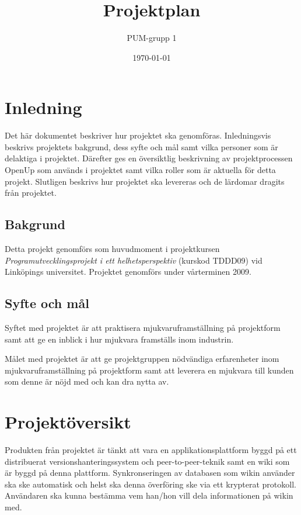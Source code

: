 

\ifpdf
\else
\fi

\title{Projektplan}
\author{PUM-grupp 1}
\date{\today}



\maketitle\thispagestyle{empty}

\newpage

\section{Inledning}
Det här dokumentet beskriver hur projektet ska genomföras. Inledningsvis beskrivs projektets bakgrund, dess syfte och mål samt vilka personer som är delaktiga i projektet. Därefter ges en översiktlig beskrivning av projektprocessen OpenUp som används i projektet samt vilka roller som är aktuella för detta projekt. Slutligen beskrivs hur projektet ska levereras och de lärdomar dragits från projektet.

\subsection{Bakgrund}
Detta projekt genomförs som huvudmoment i projektkursen \textit{Programutvecklingsprojekt i ett helhetsperspektiv} (kurskod TDDD09) vid Linköpings universitet. Projektet genomförs under vårterminen 2009.

\subsection{Syfte och mål}
Syftet med projektet är att praktisera mjukvaruframställning på projektform samt att ge en inblick i hur mjukvara framställs inom industrin.

Målet med projektet är att ge projektgruppen nödvändiga erfarenheter inom mjukvaruframställning på projektform samt att leverera en mjukvara till kunden som denne är nöjd med och kan dra nytta av.

\section{Projektöversikt}
Produkten från projektet är tänkt att vara en applikationsplattform byggd på ett distribuerat versionshanteringssystem och peer-to-peer-teknik samt en wiki som är byggd på denna plattform. Synkronseringen av databasen som wikin använder ska ske automatisk och helst ska denna överföring ske via ett krypterat protokoll. Användaren ska kunna bestämma vem han/hon vill dela informationen på wikin med.

